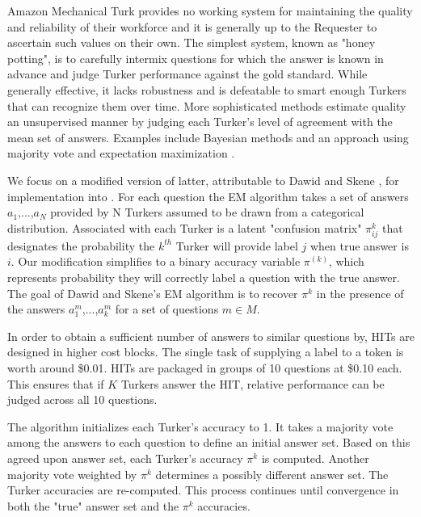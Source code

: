 Amazon Mechanical Turk provides no working system for maintaining the quality and reliability of their workforce and it is generally up to the Requester to ascertain such values on their own.  The simplest system, known as "honey potting", is to carefully intermix questions for which the answer is known in advance and judge Turker performance against the gold standard.  While generally effective, it lacks robustness and is defeatable to smart enough Turkers that can recognize them over time.  More sophisticated methods estimate quality an unsupervised manner by judging each Turker's level of agreement with the mean set of answers.  Examples include Bayesian \cite{citeulike:9437699, DBLP:journals/jmlr/RaykarY12} methods and an approach using majority vote and expectation maximization \cite{Ipeirotis:2010:QMA:1837885.1837906}.

We focus on a modified version of latter, attributable to Dawid and Skene \cite{1979}, for implementation into \sysName .  For each question the EM algorithm takes a set of answers $a_{1}$,...,$a_{N}$ provided by N Turkers assumed to be drawn from a categorical distribution.  Associated with each Turker is a latent "confusion matrix" $\pi^{k}_{ij}$ that designates the probability the $k^{th}$ Turker will provide label $j$ when true answer is $i$.  Our modification simplifies to a binary accuracy variable $\pi^(k)$, which represents probability they will correctly label a question with the true answer.  The goal of Dawid and Skene's EM algorithm is to recover $\pi^{k}$ in the presence of the answers $a^{m}_{1}$,...,$a^{m}_{k}$ for a set of questions $m \in M$.

In order to obtain a sufficient number of answers to similar questions by, HITs are designed in higher cost blocks.  The single task of supplying a label to a token is worth around \$0.01.  HITs are packaged in groups of 10 questions at \$0.10 each.  This ensures that if $K$ Turkers answer the HIT, relative performance can be judged across all 10 questions.

The algorithm initializes each Turker's accuracy to 1.  It takes a majority vote among the answers to each question to define an initial answer set.  Based on this agreed upon answer set, each Turker's accuracy $\pi^{k}$ is computed.  Another majority vote weighted by $\pi^{k}$ determines a possibly different answer set.  The Turker accuracies are re-computed.  This process continues until convergence in both the "true" answer set and the $\pi^{k}$ accuracies.

